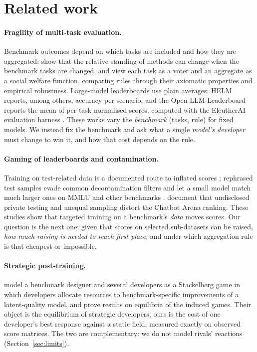 \section{Related work}
\label{sec:related}

\paragraph{Fragility of multi-task evaluation.}
Benchmark outcomes depend on which tasks are included and how they are aggregated: \citet{dehghani2021benchmark} show that the relative standing of methods can change when the benchmark tasks are changed, and \citet{lanctot2023evaluating} view each task as a voter and an aggregate as a social welfare function, comparing rules through their axiomatic properties and empirical robustness. Large-model leaderboards use plain averages: HELM \citep{liang2022holistic} reports, among others, accuracy per scenario, and the Open LLM Leaderboard reports the mean of per-task normalised scores, computed with the EleutherAI evaluation harness \citep{gao2023harness}. These works vary the \emph{benchmark} (tasks, rule) for fixed models. We instead fix the benchmark and ask what a single \emph{model's developer} must change to win it, and how that cost depends on the rule.

\paragraph{Gaming of leaderboards and contamination.}
Training on test-related data is a documented route to inflated scores \citep{zhou2023cheater}; rephrased test samples evade common decontamination filters and let a small model match much larger ones on MMLU and other benchmarks \citep{yang2023rephrased}. \citet{singh2025illusion} document that undisclosed private testing and unequal sampling distort the Chatbot Arena ranking. These studies show that targeted training on a benchmark's \emph{data} moves scores. Our question is the next one: given that scores on selected sub-datasets can be raised, \emph{how much raising is needed to reach first place}, and under which aggregation rule is that cheapest or impossible.

\paragraph{Strategic post-training.}
\citet{chen2026incentives} model a benchmark designer and several developers as a Stackelberg game in which developers allocate resources to benchmark-specific improvements of a latent-quality model, and prove results on equilibria of the induced games. Their object is the equilibrium of strategic developers; ours is the cost of one developer's best response against a static field, measured exactly on observed score matrices. The two are complementary: we do not model rivals' reactions (Section~\ref{sec:limits}).

